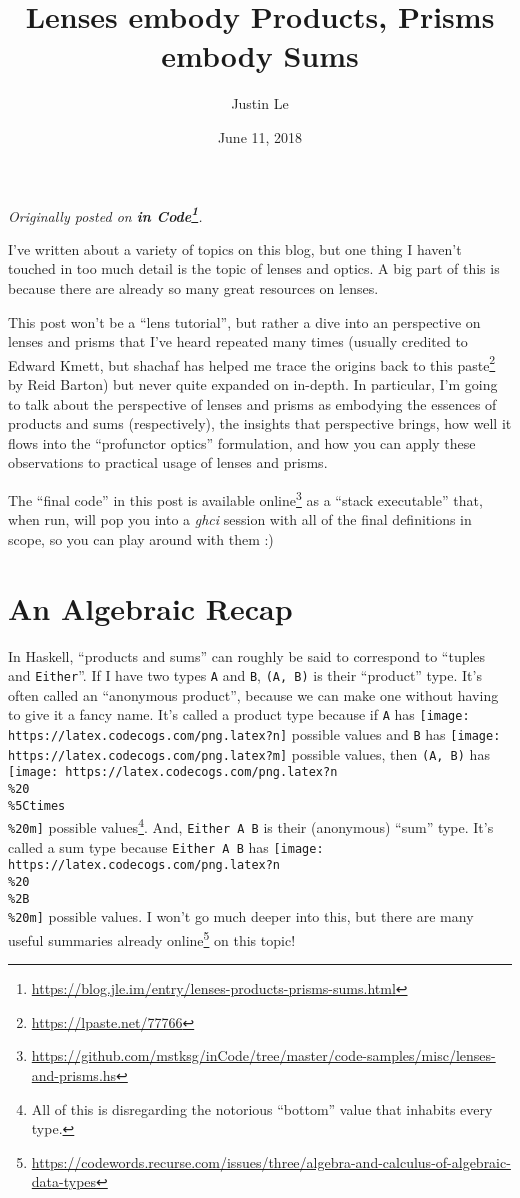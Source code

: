 \documentclass[]{article}
\title{Lenses embody Products, Prisms embody Sums}
\author{Justin Le}
\date{June 11, 2018}
\renewcommand{\href}[2]{#2\footnote{\url{#1}}}
\begin{document}
\maketitle

\emph{Originally posted on
\textbf{\href{https://blog.jle.im/entry/lenses-products-prisms-sums.html}{in
Code}}.}

I've written about a variety of topics on this blog, but one thing I haven't
touched in too much detail is the topic of lenses and optics. A big part of this
is because there are already so many great resources on lenses.

This post won't be a ``lens tutorial'', but rather a dive into an perspective on
lenses and prisms that I've heard repeated many times (usually credited to
Edward Kmett, but shachaf has helped me trace the origins back to
\href{https://lpaste.net/77766}{this paste} by Reid Barton) but never quite
expanded on in-depth. In particular, I'm going to talk about the perspective of
lenses and prisms as embodying the essences of products and sums (respectively),
the insights that perspective brings, how well it flows into the ``profunctor
optics'' formulation, and how you can apply these observations to practical
usage of lenses and prisms.

The ``final code'' in this post is
\href{https://github.com/mstksg/inCode/tree/master/code-samples/misc/lenses-and-prisms.hs}{available
online} as a ``stack executable'' that, when run, will pop you into a
\emph{ghci} session with all of the final definitions in scope, so you can play
around with them :)

\hypertarget{an-algebraic-recap}{%
\section{An Algebraic Recap}\label{an-algebraic-recap}}

In Haskell, ``products and sums'' can roughly be said to correspond to ``tuples
and \texttt{Either}''. If I have two types \texttt{A} and \texttt{B},
\texttt{(A,\ B)} is their ``product'' type. It's often called an ``anonymous
product'', because we can make one without having to give it a fancy name. It's
called a product type because if \texttt{A} has
\texttt{[image: https://latex.codecogs.com/png.latex?n]} possible values and
\texttt{B} has \texttt{[image: https://latex.codecogs.com/png.latex?m]} possible
values, then \texttt{(A,\ B)} has
\texttt{[image: https://latex.codecogs.com/png.latex?n\\\%20\\\%5Ctimes\\\%20m]}
possible values\footnote{All of this is disregarding the notorious ``bottom''
  value that inhabits every type.}. And, \texttt{Either\ A\ B} is their
(anonymous) ``sum'' type. It's called a sum type because \texttt{Either\ A\ B}
has \texttt{[image: https://latex.codecogs.com/png.latex?n\\\%20\\\%2B\\\%20m]}
possible values. I won't go much deeper into this, but there are
\href{https://codewords.recurse.com/issues/three/algebra-and-calculus-of-algebraic-data-types}{many
useful summaries already online} on this topic!
\end{document}
